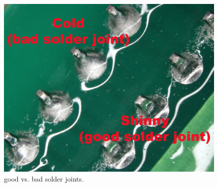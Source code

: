 \begin{figure}[h]
    \caption{good vs. bad solder joints.}
    \centering \includegraphics[scale=0.25]{images/joints.jpg}
\end{figure}

\pagebreak

